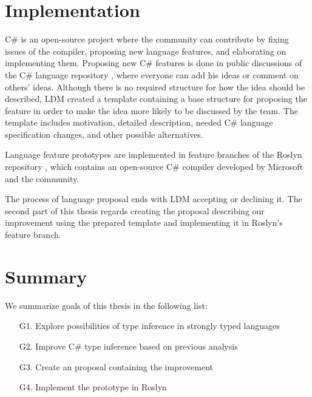 \section{Implementation}

C\# is an open-source project where the community can contribute by fixing issues of the compiler, proposing new language features, and elaborating on implementing them. 
Proposing new C\# features is done in public discussions of the C\# language repository \cite{online:langRepo}, where everyone can add his ideas or comment on others' ideas. 
Although there is no required structure for how the idea should be described, \ac{LDM} created a template \cite{online:proposalTemplate} containing a base structure for proposing the feature in order to make the idea more likely to be discussed by the team. 
The template includes motivation, detailed description, needed C\# language specification \cite{online:langSpec} changes, and other possible alternatives.
\par
{}
Language feature prototypes are implemented in feature branches of the Roslyn repository \cite{online:roslynRepo}, which contains an open-source C\# compiler developed by Microsoft and the community.
\par
{}
The process of language proposal ends with \ac{LDM} accepting or declining it. 
The second part of this thesis regards creating the proposal describing our improvement using the prepared template and implementing it in Roslyn’s feature branch.
\par

\section{Summary}

We summarize goals of this thesis in the following list:

\begin{enumerate}
  \item[G1.] Explore possibilities of type inference in strongly typed languages
  \item[G2.] Improve C\# type inference based on previous analysis
  \item[G3.] Create an proposal containing the improvement
  \item[G4.] Implement the prototype in Roslyn
\end{enumerate}